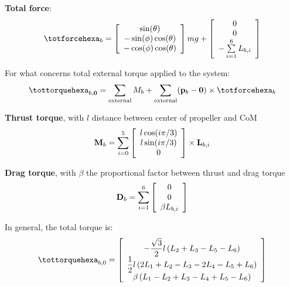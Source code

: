 \textbf{Total force}:
\begin{equation}
\totforcehexa_b = \vettore{\sin(\theta) \\ -\sin(\phi)\cos(\theta) \\ - \cos(\phi)\cos(\theta)} m g + \vettore{ 0 \\ 0 \\ - \sum\limits_{i=1}^6 L_{b,i}}
\end{equation}

For what concerns total external torque applied to the system:
\begin{equation}
\tottorquehexa_{b,\mathbf{0}} = \sum\limits_{\mathrm{external}} M_b + \sum\limits_{\mathrm{external}} (\mathbf{p}_b - \mathbf{0}) \times \totforcehexa_b
\end{equation}

\textbf{Thrust torque}, with $l$ distance between center of propeller and CoM
\begin{equation}
\mathbf{M}_b = \sum\limits_{i=0}^5 \left[\begin{array}{c} l \cos(i \pi/3) \\ l \sin(i \pi /3) \\ 0 \end{array}\right] \times \mathbf{L}_{b,i}
\end{equation}

\textbf{Drag torque}, with $\beta$ the proportional factor between thrust and drag torque
\begin{equation}
\mathbf{D}_b = \sum\limits_{i=1}^6 \left[\begin{array}{c} 0 \\ 0 \\ \beta L_{b,i}\end{array}\right]
\end{equation}

In general, the total torque is:
\begin{equation}
\tottorquehexa_{b,0} = \left[ \begin{array}{c}
-\dfrac{\sqrt{3}}{2} l \left( L_2 +L_3 - L_5 - L_6 \right) \\
\dfrac{1}{2} l \left( 2 L_1 + L_2 -L_3 - 2 L_4 - L_5 + L_6 \right) \\ 
\beta \left( L_1 - L_2 + L_3 - L_4 + L_5 - L_6 \right)
\end{array}
\right]
\end{equation}

